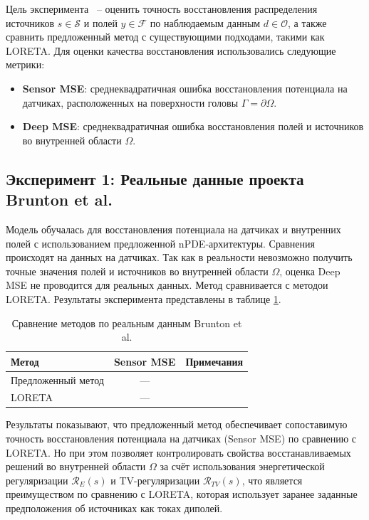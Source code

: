 \documentclass[a4paper,14pt,oneside,openany]{extarticle}
\begin{document}
 Цель эксперимента ~-- оценить точность восстановления распределения источников $s \in \mathcal{S}$ и полей $y \in \mathcal{F}$ по наблюдаемым данным $d \in \mathcal{O}$, а также сравнить предложенный метод с существующими подходами, такими как LORETA.
Для оценки качества восстановления использовались следующие метрики:
\begin{itemize}
    \item \textbf{Sensor MSE}: среднеквадратичная ошибка восстановления потенциала на датчиках, расположенных на поверхности головы $\Gamma = \partial\Omega$.
    \item \textbf{Deep MSE}: среднеквадратичная ошибка восстановления полей и источников во внутренней области $\Omega$.
\end{itemize}

\subsection{Эксперимент 1: Реальные данные проекта Brunton et al.}
\label{subsec:exp1}

Модель обучалась для восстановления потенциала на датчиках и внутренних полей с использованием предложенной nPDE-архитектуры.
Сравнения происходят на данных на датчиках. Так как в реальности невозможно получить точные значения полей и источников во внутренней области $\Omega$, оценка Deep MSE не проводится для реальных данных.
Метод сравнивается с методои LORETA. Результаты эксперимента представлены в таблице \ref{tab:brunton_results}.

\begin{table}[h]
\centering
\begin{tabular}{lcc}
\hline
Метод & Sensor MSE & Примечания \\
\hline
Предложенный метод & --- \\
LORETA & --- \\
\hline
\end{tabular}
\caption{Сравнение методов по реальным данным Brunton et al.}
\label{tab:brunton_results}
\end{table}

Результаты показывают, что предложенный метод обеспечивает сопоставимую точность восстановления потенциала на датчиках (Sensor MSE) по сравнению с LORETA.
Но при этом позволяет контролировать свойства восстанавливаемых решений во внутренней области $\Omega$ за счёт использования энергетической регуляризации $\mathcal{R}_E(s)$ и
TV-регуляризации $\mathcal{R}_{TV}(s)$, что является преимуществом по сравнению с LORETA, которая использует заранее заданные предположения об источниках как токах диполей.
\end{document}

